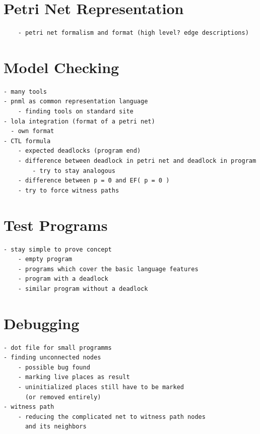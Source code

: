 \section{Petri Net Representation}
\label{app_petri}
\begin{verbatim}
    - petri net formalism and format (high level? edge descriptions)
\end{verbatim}


\section{Model Checking}
\label{app_mc}
\begin{verbatim}
- many tools
- pnml as common representation language
    - finding tools on standard site
- lola integration (format of a petri net)
  - own format
- CTL formula
    - expected deadlocks (program end)
    - difference between deadlock in petri net and deadlock in program
        - try to stay analogous
    - difference between p = 0 and EF( p = 0 )
    - try to force witness paths
\end{verbatim}

\section{Test Programs}
\label{app_test}
\begin{verbatim}
- stay simple to prove concept
    - empty program
    - programs which cover the basic language features
    - program with a deadlock
    - similar program without a deadlock
\end{verbatim}

\section{Debugging}
\label{app_debug}
\begin{verbatim}
- dot file for small programms
- finding unconnected nodes
    - possible bug found
    - marking live places as result
    - uninitialized places still have to be marked
      (or removed entirely)
- witness path
    - reducing the complicated net to witness path nodes 
      and its neighbors
\end{verbatim}